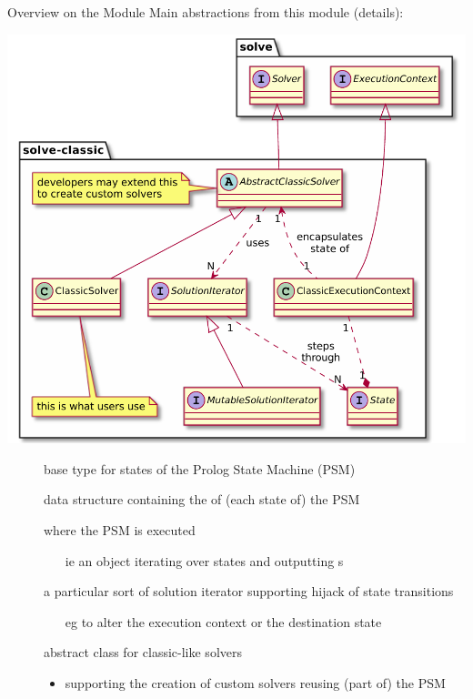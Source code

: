 \documentclass[handout]{beamer}
\begin{document}
\begin{frame}[allowframebreaks]{Overview on the  Module}
    Main abstractions from this module (details):
    \begin{center}
        \includegraphics[width=.6\linewidth]{img/classic-details.pdf}
    \end{center}

    \begin{description}
        \item[] base type for states of the Prolog State Machine (PSM)
        
        \medskip

        \item[] data structure containing the  of (each state of) the PSM
        
        \medskip
        
        \item[] where the PSM is executed
        \begin{itemize}
            \item[ie] an object iterating over states and outputting s
        \end{itemize} 

        \medskip
        
        \item[] a particular sort of solution iterator supporting \alert{hijack of state transitions}
        \begin{itemize}
            \item[eg] to alter the execution context or the destination state
        \end{itemize}  

        \medskip

        \item[] abstract class for classic-like solvers
        \begin{itemize}
            \item supporting the creation of custom solvers reusing (part of) the PSM
        \end{itemize}   
    \end{description}
\end{frame}
\end{document}
